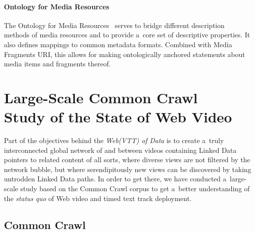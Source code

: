\documentclass{sig-alternate}
\begin{document}
\paragraph{Ontology for Media Resources}

The Ontology for Media Resources~\cite{lee2012mediaontology}
serves to bridge different description methods of media resources
and to provide a~core set of descriptive properties.
It also defines mappings to common metadata formats.
Combined with Media Fragments URI,
this allows for making ontologically anchored statements
about media items and fragments thereof.

\section{Large-Scale Common Crawl\\ Study of the State of Web Video}
\label{sec:large-scale-common-crawl-study-of-the-state-of-web-video}

Part of the objectives behind the \emph{Web(VTT) of Data}
is to create a~truly interconnected global network of and between videos
containing Linked Data pointers to related content of all sorts,
where diverse views are not filtered by the network bubble, 
but where serendipitously new views can be discovered
by taking untrodden Linked Data paths.
In order to get there,
we have conducted a~large-scale study
based on the Common Crawl corpus to get a~better understanding
of the \emph{status quo} of Web video and timed text track deployment.

\subsection{Common Crawl}
\end{document}
